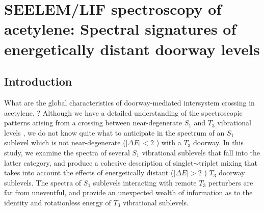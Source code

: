 % 







\chapter{SEELEM/LIF spectroscopy of acetylene: Spectral signatures of
  energetically distant doorway levels}

\section{Introduction}

What are the global characteristics of doorway-mediated intersystem
crossing in acetylene, ?  Although we have a detailed
understanding of the spectroscopic patterns arising from a crossing
between near-degenerate $S_1$ and $T_3$ vibrational levels
\cite{humphrey97, altunata00, altunata01, mishra04}, we do not know
quite what to anticipate in the spectrum of an $S_1$ sublevel which is
not near-degenerate ($\lvert \Delta E \rvert < 2$ \rcm) with a $T_3$
doorway.  In this study, we examine the spectra of several $S_1$
vibrational sublevels that fall into the latter category, and produce
a cohesive description of singlet$\sim$triplet mixing that takes into
account the effects of energetically distant ($\lvert \Delta E \rvert
> 2$ \rcm) $T_3$ doorway sublevels.  The spectra of $S_1$ sublevels
interacting with remote $T_3$ perturbers are far from uneventful, and
provide an unexpected wealth of information as to the identity and
rotationless energy of $T_3$ vibrational sublevels.

